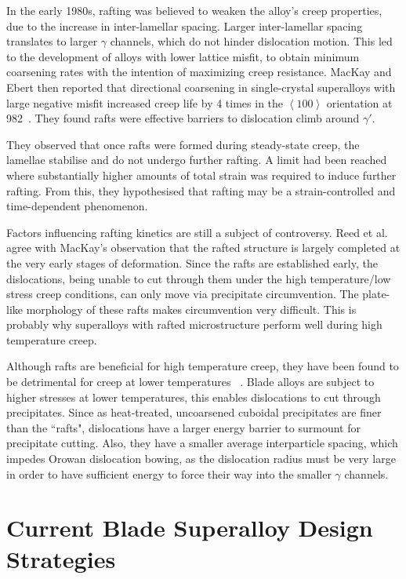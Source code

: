 \vspace{-1cm}
%
In the early 1980s, rafting was believed to weaken the alloy's creep properties, due to the increase in inter-lamellar spacing.  Larger inter-lamellar spacing translates to larger $\gamma$ channels, which do not hinder dislocation motion.  This led to the development of alloys with lower lattice misfit, to obtain minimum coarsening rates with the intention of maximizing creep resistance.  MacKay and Ebert then reported that directional coarsening in single-crystal superalloys with large negative misfit increased creep life by 4 times in the $\left<100\right>$ orientation at 982\celsius\ \cite{mackay83}.  They found rafts were effective barriers to dislocation climb around $\gamma'$.

They observed that once rafts were formed during steady-state creep, the lamellae stabilise and do not undergo further rafting.  A limit had been reached where substantially higher amounts of total strain was required to induce further rafting.  From this, they hypothesised that rafting may be a strain-controlled and time-dependent phenomenon.

Factors influencing rafting kinetics are still a subject of controversy.  Reed et al. agree with MacKay's observation that the rafted structure is largely completed at the very early stages of deformation.  Since the rafts are established early, the dislocations, being unable to cut through them under the high temperature/low stress creep conditions, can only move via precipitate circumvention.  The plate-like morphology of these rafts makes circumvention very difficult.  This is probably why superalloys with rafted microstructure perform well during high temperature creep.

Although rafts are beneficial for high temperature creep, they have been found to be detrimental for creep at lower temperatures ~\cite{hobbs08}.  Blade alloys are subject to higher stresses at lower temperatures, this enables dislocations to cut through precipitates.  Since as heat-treated, uncoarsened cuboidal precipitates are finer than the ``rafts", dislocations have a larger energy barrier to surmount for precipitate cutting.  Also, they have a smaller average interparticle spacing, which impedes Orowan dislocation bowing, as the dislocation radius must be very large in order to have sufficient energy to force their way into the smaller $\gamma$ channels.


\section{Current Blade Superalloy Design Strategies}

